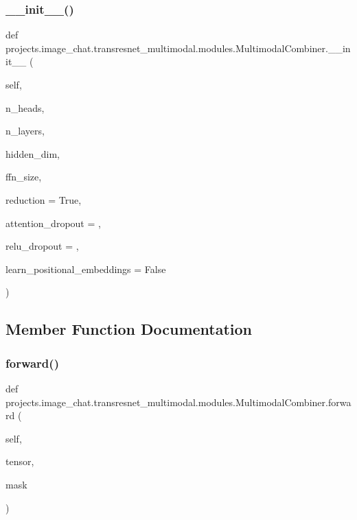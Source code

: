 \subsubsection{\texorpdfstring{\+\_\+\+\_\+init\+\_\+\+\_\+()}{\_\_init\_\_()}}
{\footnotesize\ttfamily def projects.\+image\+\_\+chat.\+transresnet\+\_\+multimodal.\+modules.\+Multimodal\+Combiner.\+\_\+\+\_\+init\+\_\+\+\_\+ (\begin{DoxyParamCaption}\item[{}]{self,  }\item[{}]{n\+\_\+heads,  }\item[{}]{n\+\_\+layers,  }\item[{}]{hidden\+\_\+dim,  }\item[{}]{ffn\+\_\+size,  }\item[{}]{reduction = {\ttfamily True},  }\item[{}]{attention\+\_\+dropout = {},  }\item[{}]{relu\+\_\+dropout = {},  }\item[{}]{learn\+\_\+positional\+\_\+embeddings = {\ttfamily False} }\end{DoxyParamCaption})}



\subsection{Member Function Documentation}
\mbox{\label{classprojects_1_1image__chat_1_1transresnet__multimodal_1_1modules_1_1MultimodalCombiner_a9cbcfc6a2c97c9636ec1f77ce898c6f0}} 
\subsubsection{\texorpdfstring{forward()}{forward()}}
{\footnotesize\ttfamily def projects.\+image\+\_\+chat.\+transresnet\+\_\+multimodal.\+modules.\+Multimodal\+Combiner.\+forward (\begin{DoxyParamCaption}\item[{}]{self,  }\item[{}]{tensor,  }\item[{}]{mask }\end{DoxyParamCaption})}


